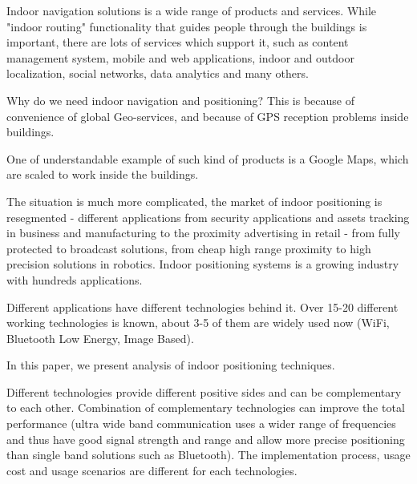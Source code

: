 \cite{Infsoft_wp}

%
%
%
%

Indoor navigation solutions is a wide range of products and services. While "indoor routing" functionality that guides people through the buildings is important, there are lots of services which support it, such as content management system, mobile and web applications, indoor and outdoor localization, social networks, data analytics and many others.

Why do we need indoor navigation and positioning? This is because of convenience of global Geo-services, and because of GPS reception problems inside buildings.

One of understandable example of such kind of products is a Google Maps, which are scaled to work inside the buildings.

The situation is much more complicated, the market of indoor positioning is resegmented - different applications from security applications and assets tracking in business and manufacturing to the proximity advertising in retail - from fully protected to broadcast solutions, from cheap high range proximity to high precision solutions in robotics. Indoor positioning systems is a growing industry with hundreds applications.

Different applications have different technologies behind it. Over 15-20 different working technologies is known, about 3-5 of them are widely used now (WiFi, Bluetooth Low Energy, Image Based).

\cite{Infsoft_wp}

%

In this paper, we present analysis of indoor positioning techniques.

Different technologies provide different positive sides and can be complementary to each other. Combination of complementary technologies can improve the total performance (ultra wide band communication uses a wider range of frequencies and thus have good signal strength and range and allow more precise positioning than single band solutions such as Bluetooth). The implementation process, usage cost and usage scenarios are different for each technologies.

